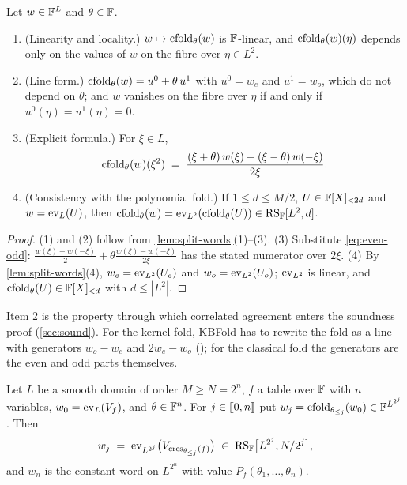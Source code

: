 \begin{lemma}\label{lem:cword}
Let $w \in \mathbb{F}^L$ and $\theta \in \mathbb{F}$.
\begin{enumerate}
  \item (Linearity and locality.) $w \mapsto \mathrm{cfold}_\theta(w)$ is $\mathbb{F}$-linear, and $\mathrm{cfold}_\theta(w)(\eta)$ depends only on the values of $w$ on the fibre over $\eta \in L^2$.
  \item (Line form.) $\mathrm{cfold}_\theta(w) = u^0 + \theta\, u^1$ with $u^0 = w_e$ and $u^1 = w_o$, which do not depend on $\theta$; and $w$ vanishes on the fibre over $\eta$ if and only if $u^0(\eta) = u^1(\eta) = 0$.
  \item (Explicit formula.) For $\xi \in L$,
  \[
    \mathrm{cfold}_\theta(w)(\xi^2) \;=\; \frac{(\xi + \theta)\, w(\xi) + (\xi - \theta)\, w(-\xi)}{2\xi}.
  \]
  \item (Consistency with the polynomial fold.) If $1 \le d \le M/2$, $U \in \mathbb{F}[X]_{<2d}$ and $w = \mathrm{ev}_L(U)$, then $\mathrm{cfold}_\theta(w) = \mathrm{ev}_{L^2}(\mathrm{cfold}_\theta(U)) \in \mathrm{RS}_{\mathbb{F}}[L^2, d]$.
\end{enumerate}
\end{lemma}

\begin{proof}
(1) and (2) follow from \cref{lem:split-words}(1)--(3).
(3) Substitute \eqref{eq:even-odd}: $\frac{w(\xi)+w(-\xi)}{2} + \theta \frac{w(\xi)-w(-\xi)}{2\xi}$ has the stated numerator over $2\xi$.
(4) By \cref{lem:split-words}(4), $w_e = \mathrm{ev}_{L^2}(U_e)$ and $w_o = \mathrm{ev}_{L^2}(U_o)$; $\mathrm{ev}_{L^2}$ is linear, and $\mathrm{cfold}_\theta(U) \in \mathbb{F}[X]_{<d}$ with $d \le |L^2|$.
\end{proof}

Item 2 is the property through which correlated agreement enters the soundness proof (\cref{sec:sound}).
For the kernel fold, KBFold has to rewrite the fold as a line with generators $w_o - w_e$ and $2w_e - w_o$ (); for the classical fold the generators are the even and odd parts themselves.

\begin{corollary}\label{cor:cword-chain}
Let $L$ be a smooth domain of order $M \ge N = 2^n$, $f$ a table over $\mathbb{F}$ with $n$ variables, $w_0 = \mathrm{ev}_L(V_f)$, and $\theta \in \mathbb{F}^n$.
For $j \in \llbracket 0, n \rrbracket$ put $w_j = \mathrm{cfold}_{\theta_{\le j}}(w_0) \in \mathbb{F}^{L^{2^j}}$. Then
\[
  w_j \;=\; \mathrm{ev}_{L^{2^j}}\bigl(V_{\mathrm{cres}_{\theta_{\le j}}(f)}\bigr) \;\in\; \mathrm{RS}_{\mathbb{F}}\bigl[L^{2^j}, N/2^j\bigr],
\]
and $w_n$ is the constant word on $L^{2^n}$ with value $P_f(\theta_1,\dots,\theta_n)$.
\end{corollary}


